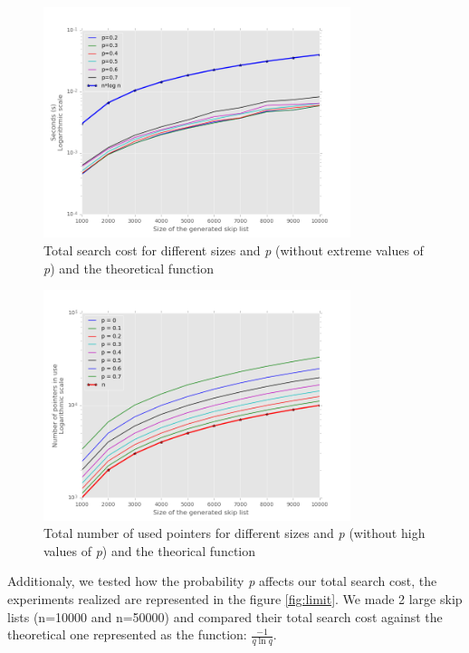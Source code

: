 \documentclass{article}
\begin{document}
\begin{figure}[H]
  \begin{center}
    \includegraphics[width=0.8\textwidth]{imgs/time_teorical.png}
    \caption{Total search cost for different sizes and \textit{p} (without extreme values of \textit{p}) and the theoretical function}
    \label{fig:search_cost_teorical}
  \end{center}
\end{figure}

\begin{figure}[H]
\begin{center}
    \includegraphics[width=0.8\textwidth]{imgs/pointers_teorical.png}
    \caption{Total number of used pointers for different sizes and \textit{p} (without high values of \textit{p}) and the theorical function}
    \label{fig:num_pointers_teorical}
  \end{center}
\end{figure}

Additionaly, we tested how the probability \textit{p} affects our total search cost, the experiments realized are represented in the figure \ref{fig:limit}.
We made 2 large skip lists (n=10000 and n=50000) and compared their total search cost against the theoretical one represented as the function: $\frac{-1}{q \ln q}$.
\end{document}
